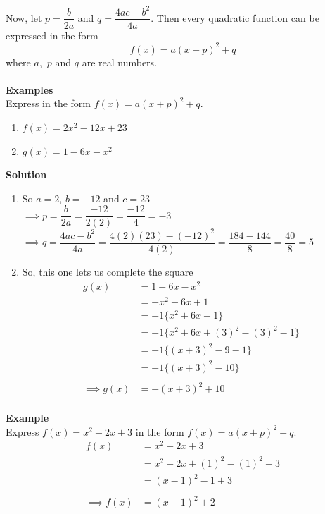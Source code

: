 \documentclass[11pt,a4paper]{article}
\begin{document}
Now, let $p=\dfrac{b}{2a}$ and $q=\dfrac{4ac-b^2}{4a}$. Then every quadratic function can be expressed in the form $$f(x)=a(x+p)^2+q$$ where $a,$ $p$ and $q$ are real numbers.\\\\

\textbf{Examples}\\
Express in the form $f(x)=a(x+p)^2+q$.
\begin{enumerate}
\item $f(x)=2x^2-12x+23$
\item $g(x)=1-6x-x^2$\\
\end{enumerate}


\textbf{Solution}
\begin{enumerate}
\item So $a=2$, $b=-12$ and $c=23$\\

$\implies p=\dfrac{b}{2a}=\dfrac{-12}{2(2)}=\dfrac{-12}{4}=-3$\\

$\implies q=\dfrac{4ac-b^2}{4a}=\dfrac{4(2)(23)-(-12)^2}{4(2)}=\dfrac{184-144}{8}=\dfrac{40}{8}=5$\\

\item So, this one lets us complete the square
\begin{align*}
g(x) & = 1-6x-x^2\\
     & = -x^2-6x+1\\
     & = -1\{x^2+6x-1\}\\
     & = -1\{x^2+6x+(3)^2-(3)^2-1\}\\
     & = -1\{(x+3)^2-9-1\}\\
     & = -1\{(x+3)^2-10\}\\\\
\implies   g(x)  & = -(x+3)^2+10\\
\end{align*}
\end{enumerate}


\textbf{Example}\\
Express $f(x)=x^2-2x+3$ in the form $f(x)=a(x+p)^2+q$.
\begin{align*}
f(x) & = x^2-2x+3\\
     & = x^2-2x+(1)^2-(1)^2+3\\
     & = (x-1)^2-1+3\\\\
\implies f(x) & = (x-1)^2+2
\end{align*}
\end{document}
